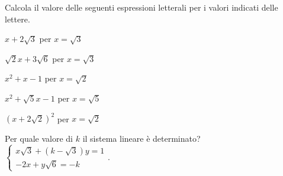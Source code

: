 \begin{esercizio}%
Calcola il valore delle seguenti espressioni letterali per i valori indicati 
delle lettere.
\begin{multicols}{3}
\begin{enumeratea}
\item \(x+2\sqrt 3\) per \(x=\sqrt 3\)
\item \(\sqrt 2x+3\sqrt 6\) per \(x=\sqrt{3}\)
\item \(x^2+x-1\) per \(x=\sqrt 2\)
\item \(x^2+\sqrt 5x-1\) per \(x=\sqrt 5\)
\item \((x+2\sqrt 2)^2\) per \(x=\sqrt 2\)
\end{enumeratea}
\end{multicols}
\end{esercizio}



\begin{esercizio}%
Per quale valore di \(k\) il sistema lineare è determinato?
\(\left\{\begin{array}{l}{x\sqrt 3+(k-\sqrt 3)y=1}\\
 {-2x+y\sqrt 6=-k} \end{array}\right..\)
\end{esercizio}


